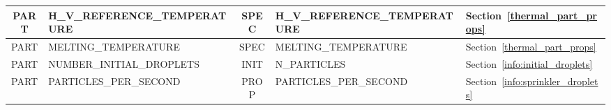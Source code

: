 \documentclass[11pt]{book}
\begin{document}
\begin{table}
\begin{tabular}{@{\extracolsep{\fill}}|c|l|c|l|l|}
{\ct PART}    & {\ct H\_V\_REFERENCE\_TEMPERATURE}  &  {\ct SPEC}  &   {\ct H\_V\_REFERENCE\_TEMPERATURE}        & Section~\ref{thermal_part_props}         \\ \hline
{\ct PART}    & {\ct MELTING\_TEMPERATURE}          &  {\ct SPEC}  & {\ct MELTING\_TEMPERATURE}                  & Section~\ref{thermal_part_props}         \\ \hline
{\ct PART}    & {\ct NUMBER\_INITIAL\_DROPLETS}     &  {\ct INIT}  & {\ct N\_PARTICLES}                          & Section~\ref{info:initial_droplets}      \\ \hline
{\ct PART}    & {\ct PARTICLES\_PER\_SECOND}        &  {\ct PROP}  & {\ct PARTICLES\_PER\_SECOND}                & Section~\ref{info:sprinkler_droplets}    \\ \hline
\end{tabular}
\end{table}
\end{document}
